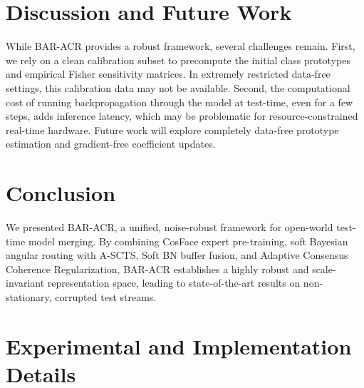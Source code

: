 \documentclass{article}
\theoremstyle{definition}
\theoremstyle{remark}
\begin{document}
\section{Discussion and Future Work}
While BAR-ACR provides a robust framework, several challenges remain. First, we rely on a clean calibration subset to precompute the initial class prototypes and empirical Fisher sensitivity matrices. In extremely restricted data-free settings, this calibration data may not be available. Second, the computational cost of running backpropagation through the model at test-time, even for a few steps, adds inference latency, which may be problematic for resource-constrained real-time hardware. Future work will explore completely data-free prototype estimation and gradient-free coefficient updates.

\section{Conclusion}
We presented BAR-ACR, a unified, noise-robust framework for open-world test-time model merging. By combining CosFace expert pre-training, soft Bayesian angular routing with A-SCTS, Soft BN buffer fusion, and Adaptive Consensus Coherence Regularization, BAR-ACR establishes a highly robust and scale-invariant representation space, leading to state-of-the-art results on non-stationary, corrupted test streams.




\newpage
\appendix
\onecolumn
\section{Experimental and Implementation Details}
\label{appendix:details}
\end{document}
